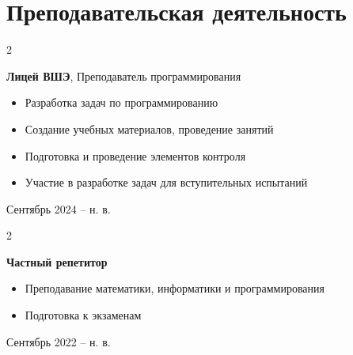 \documentclass[a4paper,10pt]{article}
\newenvironment{highlights}{
    \begin{itemize}[
        topsep=0.10 cm,
        parsep=0.10 cm,
        partopsep=0pt,
        itemsep=0pt,
        leftmargin=0.4 cm + 10pt
    ]
}{
    \end{itemize}
} %
\newenvironment{twocolentry}[2][]{
    \onecolentry
    \def\secondColumn{#2}
    \setcolumnwidth{\fill, 4.5 cm}
    \begin{paracol}{2}
}{
    \switchcolumn \raggedleft \secondColumn
    \end{paracol}
    \endonecolentry
} %
\begin{document}
\section{Преподавательская деятельность}
    \begin{twocolentry}{Сентябрь 2024 – н. в.}
        \textbf{Лицей ВШЭ}, Преподаватель программирования
        \begin{highlights}
            \item Разработка задач по программированию
            \item Создание учебных материалов, проведение занятий
            \item Подготовка и проведение элементов контроля
            \item Участие в разработке задач для вступительных испытаний
        \end{highlights}
    \end{twocolentry}

    \begin{twocolentry}{Сентябрь 2022 – н. в.}
        \textbf{Частный репетитор}
        \begin{highlights}
            \item Преподавание математики, информатики и программирования
            \item Подготовка к экзаменам
        \end{highlights}
    \end{twocolentry}
\end{document}
